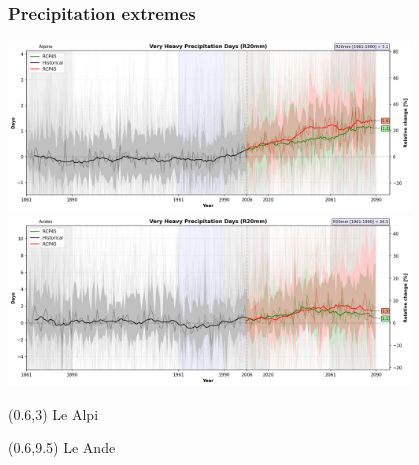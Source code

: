 
\begin{frame}
\frametitle{Precipitation extremes}
\begin{center}

{\includegraphics[width=0.8\textwidth]{risultati/r20mm_Alpine_Models_ts}}
{\includegraphics[width=0.8\textwidth]{risultati/r20mm_Andes_Models_ts}}
\end{center}

{
  \scriptsize
  \begin{textblock}{1.8}(0.6,3)
     {\color{gray} Le Alpi}
  \end{textblock}
}


{
  \scriptsize
  \begin{textblock}{1.8}(0.6,9.5)
     {\color{gray} Le Ande}
  \end{textblock}
}

\end{frame}

